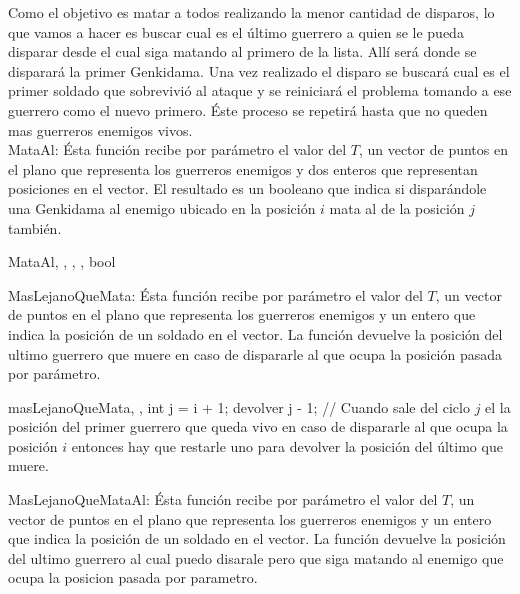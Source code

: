 	   	Como el objetivo es matar a todos realizando la menor cantidad de disparos, lo que vamos a hacer es buscar cual es el último guerrero a quien se le pueda disparar desde el cual siga matando al primero de la lista. Allí será donde se disparará la primer Genkidama. Una vez realizado el disparo se buscará cual es el primer soldado que sobrevivió al ataque y se reiniciará el problema tomando a ese guerrero como el nuevo primero. Éste proceso se repetirá hasta que no queden mas guerreros enemigos vivos. \\

		
		MataAl:
		Ésta función recibe por parámetro el valor del $T$,  un vector de puntos en el plano que representa los guerreros enemigos y dos enteros que representan posiciones en el vector.  El resultado es un booleano que indica si disparándole una Genkidama al enemigo ubicado en la posición $i$ mata al de la posición $j$ también.\\

		\begin{algoritmo}{MataAl}{, , , ,  }{bool}

		\end{algoritmo}
		
		MasLejanoQueMata:
		Ésta función recibe por parámetro el valor del $T$, un vector de puntos en el plano que representa los guerreros enemigos y un entero que indica la posición de un soldado en el vector.
		La función devuelve la posición del ultimo guerrero que muere en caso de dispararle al que ocupa la posición pasada por parámetro.\\

		\begin{algoritmo}{masLejanoQueMata}{, , }{int}
			j = i + 1;\;
  			devolver j - 1; // Cuando sale del ciclo $j$ el la posición del primer guerrero que queda vivo en caso de dispararle al que ocupa la posición $i$ entonces hay que restarle uno para devolver la posición del último que muere.\;
		\end{algoritmo}

		
		MasLejanoQueMataAl:
		Ésta función recibe por parámetro el valor del $T$,  un vector de puntos en el plano que representa los guerreros enemigos y un entero que indica la posición de un soldado en el vector.
		La función devuelve la posición del ultimo guerrero al cual puedo disarale pero que siga matando al enemigo que ocupa la posicion pasada por parametro.\\ 

